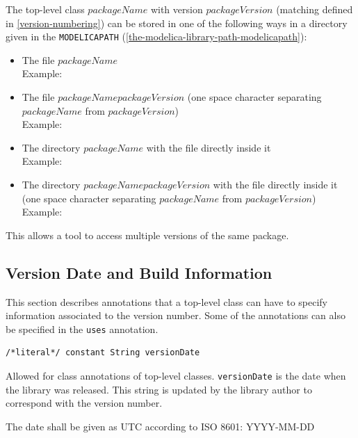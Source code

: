 The top-level class $\mathit{packageName}$ with version $\mathit{packageVersion}$ (matching  defined in \cref{version-numbering}) can be stored in one of the following ways in a directory given in the \lstinline!MODELICAPATH! (\cref{the-modelica-library-path-modelicapath}):
\begin{itemize}
\item
  The file $\mathit{packageName}$\\
  Example: 
\item
  The file $\mathit{packageName}$\filename{\ }$\mathit{packageVersion}$ (one space character separating $\mathit{packageName}$ from $\mathit{packageVersion}$)\\
  Example: 
\item
  The directory $\mathit{packageName}$ with the file  directly inside it\\
  Example: 
\item
  The directory $\mathit{packageName}$\filename{\ }$\mathit{packageVersion}$ with the file  directly inside it (one space character separating $\mathit{packageName}$ from $\mathit{packageVersion}$)\\
  Example: 
\end{itemize}

This allows a tool to access multiple versions of the same package.


\subsection{Version Date and Build Information}\label{version-date-and-build-information}

This section describes annotations that a top-level class can have to specify information associated to the version number.
Some of the annotations can also be specified in the \lstinline!uses! annotation.

\begin{annotationdefinition}[versionDate]
\begin{synopsis}\begin{lstlisting}
/*literal*/ constant String versionDate
\end{lstlisting}\end{synopsis}
\begin{semantics}
Allowed for class annotations of top-level classes.
\lstinline!versionDate! is the date when the library was released.
This string is updated by the library author to correspond with the version number.

The date shall be given as UTC according to ISO 8601: YYYY-MM-DD
\end{semantics}
\end{annotationdefinition}

